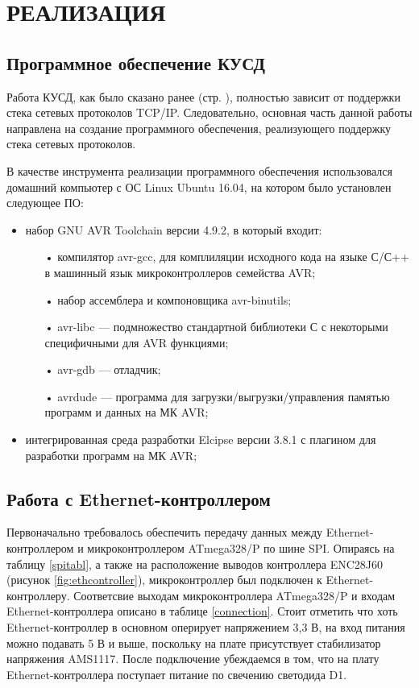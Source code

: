 \chapter{РЕАЛИЗАЦИЯ}

\section{Программное обеспечение КУСД}

Работа КУСД, как было сказано ранее (стр. \pageref{reasonofwork}), полностью зависит от поддержки стека сетевых протоколов TCP/IP. Следовательно, основная часть данной работы направлена на создание программного обеспечения, реализующего поддержку стека сетевых протоколов.

В качестве инструмента реализации программного обеспечения использовался домашний компьютер с ОС Linux Ubuntu 16.04, на котором было установлен следующее ПО:
 \begin{itemize}
	\item набор GNU AVR Toolchain версии 4.9.2, в который входит\cite{avrtoolchain}:
	\begin{itemize}
		\item[•] компилятор avr-gcc, для комплиляции исходного кода на языке С/С++ в машинный язык микроконтроллеров семейства AVR;
		\item[•] набор ассемблера и компоновщика avr-binutils;
		\item[•] avr-libc --- подмножество стандартной библиотеки С с некоторыми специфичными для AVR функциями;
		\item[•] avr-gdb --- отладчик;
		\item[•] avrdude --- программа для загрузки/выгрузки/управления памятью программ и данных на МК AVR;
	\end{itemize}
	\item интегрированная среда разработки Elcipse версии 3.8.1 с плагином для разработки программ на МК AVR;
\end{itemize}

\section{Работа с Ethernet-контроллером}

Первоначально требовалось обеспечить передачу данных между Ethernet-контроллером и микроконтроллером ATmega328/P по шине SPI. Опираясь на таблицу \ref{spitabl}, а также на расположение выводов контроллера ENC28J60 (рисунок \ref{fig:ethcontroller}), микроконтроллер был подключен к Ethernet-контроллеру. Соответсвие выходам микроконтроллера ATmega328/P и входам Ethernet-контроллера описано в таблице \ref{connection}. Стоит отметить что хоть Ethernet-контроллер в основном оперирует напряжением 3,3 В, на вход питания можно подавать 5 В и выше, поскольку на плате присутствует стабилизатор напряжения AMS1117\cite{voltageregulator}. После подключение убеждаемся в том, что на плату Ethernet-контроллера поступает питание по свечению светодида D1. 

